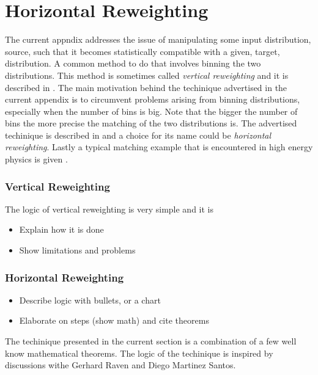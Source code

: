 
\chapter{Horizontal Reweighting}
\label{AppendixB}

The current appndix addresses the issue of manipulating some input distribution, source, such that
it becomes statistically compatible with a given, target, distribution. A common method to do that
involves binning the two distributions. This method is sometimes called {\it vertical reweighting}
and it is described in . The main motivation behind the techinique advertised in the current
appendix is to circumvent problems arising from binning distributions, especially when the number of
bins is big. Note that the bigger the number of bins the more precise the matching of the two distributions
is. The advertised techinique is described in  and a choice for its name could be {\it horizontal reweighting}.
Lastly a typical matching example that is encountered in high energy physics is given .


\subsection{Vertical Reweighting}
\label{vertical_reweighting}

The logic of vertical reweighting is very simple and it is 


\begin{itemize}
  \item Explain how it is done
  \item Show limitations and problems
\end{itemize}

\subsection{Horizontal Reweighting}
\label{horizontal_reweighting}


\begin{itemize}
  \item Describe logic with bullets, or a chart
  \item Elaborate on steps (show math) and cite theorems
\end{itemize}

The techinique presented in the current section is a combination of a few well know mathematical theorems.
The logic of the techinique is inspired by discussions withe Gerhard Raven and Diego Martinez Santos.



